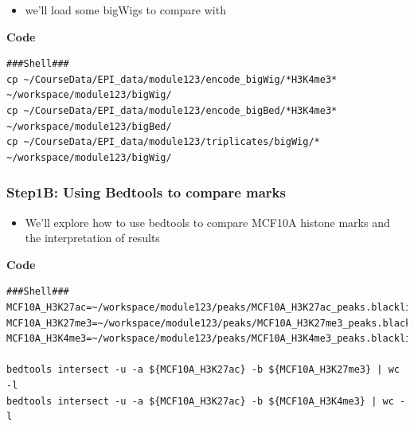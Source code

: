 \documentclass[
]{book}
\providecommand{\tightlist}{%
  \setlength{\itemsep}{0pt}\setlength{\parskip}{0pt}}
\begin{document}
\begin{itemize}
\tightlist
\item
  we'll load some bigWigs to compare with
\end{itemize}

\textbf{Code}

\begin{verbatim}
###Shell###
cp ~/CourseData/EPI_data/module123/encode_bigWig/*H3K4me3* ~/workspace/module123/bigWig/
cp ~/CourseData/EPI_data/module123/encode_bigBed/*H3K4me3* ~/workspace/module123/bigBed/
cp ~/CourseData/EPI_data/module123/triplicates/bigWig/* ~/workspace/module123/bigWig/
\end{verbatim}

\subsubsection{Step1B: Using Bedtools to compare marks}\label{step1b-using-bedtools-to-compare-marks}

\begin{itemize}
\tightlist
\item
  We'll explore how to use bedtools to compare MCF10A histone marks and the interpretation of results
\end{itemize}

\textbf{Code}

\begin{verbatim}
###Shell###
MCF10A_H3K27ac=~/workspace/module123/peaks/MCF10A_H3K27ac_peaks.blacklistRemoved.narrowPeak
MCF10A_H3K27me3=~/workspace/module123/peaks/MCF10A_H3K27me3_peaks.blacklistRemoved.broadPeak
MCF10A_H3K4me3=~/workspace/module123/peaks/MCF10A_H3K4me3_peaks.blacklistRemoved.narrowPeak

bedtools intersect -u -a ${MCF10A_H3K27ac} -b ${MCF10A_H3K27me3} | wc -l
bedtools intersect -u -a ${MCF10A_H3K27ac} -b ${MCF10A_H3K4me3} | wc -l
\end{verbatim}
\end{document}
